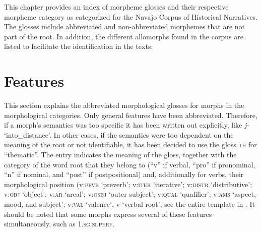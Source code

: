 \appendix\label{appendix}

This chapter provides an index of morpheme glosses and their respective morpheme category as categorized for the Navajo Corpus of Historical Narratives. The glosses include abbreviated and non-abbreviated morphemes that are not part of the root. In addition, the different allomorphs found in the corpus are listed to facilitate the identification in the texts.

\section*{Features}\label{appendix:features}

This section explains the abbreviated morphological glosses for morphs in the morphological categories. Only general features have been abbreviated. Therefore, if a morph's semantics was too specific it has been written out explicitly, like \textit{j-} `into\_distance'. In other cases, if the semantics were too dependent on the meaning of the root or not identifiable, it has been decided to use the gloss \textsc{th} for ``thematic''. The entry indicates the meaning of the gloss, together with the category of the word root that they belong to (``v'' if verbal, ``pro'' if pronominal, ``n'' if nominal, and ``post'' if postpositional) and, additionally for verbs, their morphological position (v:\textsc{prvb} `preverb'; v:\textsc{iter} `iterative'; v:\textsc{distr} `distributive'; v:\textsc{obj} `object'; v:\textsc{ar} `areal'; v:\textsc{osbj} `outer subject'; v:\textsc{qual} `qualifier'; v:\textsc{ams} `aspect, mood, and subject'; v:\textsc{val} `valence', v `verbal root', see the entire template in . It should be noted that some morphs express several of these features simultaneously, such as 1.\textsc{sg}.\textsc{si}.\textsc{perf}.

